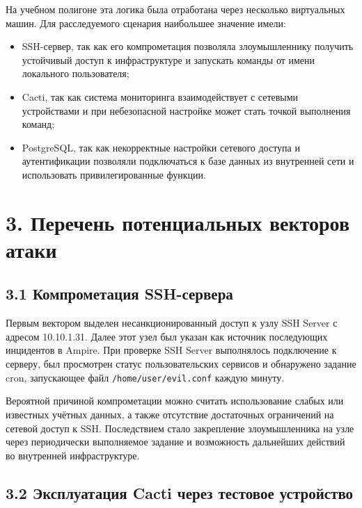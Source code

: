 \documentclass[14pt]{extarticle}
\begin{document}
На учебном полигоне эта логика была отработана через несколько виртуальных машин. Для расследуемого сценария наибольшее значение имели:
\begin{itemize}
  \item SSH-сервер, так как его компрометация позволяла злоумышленнику получить устойчивый доступ к инфраструктуре и запускать команды от имени локального пользователя;
  \item Cacti, так как система мониторинга взаимодействует с сетевыми устройствами и при небезопасной настройке может стать точкой выполнения команд;
  \item PostgreSQL, так как некорректные настройки сетевого доступа и аутентификации позволяли подключаться к базе данных из внутренней сети и использовать привилегированные функции.
\end{itemize}

\clearpage

\section*{3. Перечень потенциальных векторов атаки}

\subsection*{3.1 Компрометация SSH-сервера}

Первым вектором выделен несанкционированный доступ к узлу SSH Server с адресом 10.10.1.31. Далее этот узел был указан как источник последующих инцидентов в Ampire. При проверке SSH Server выполнялось подключение к серверу, был просмотрен статус пользовательских сервисов и обнаружено задание cron, запускающее файл \texttt{/home/user/evil.conf} каждую минуту.

Вероятной причиной компрометации можно считать использование слабых или известных учётных данных, а также отсутствие достаточных ограничений на сетевой доступ к SSH. Последствием стало закрепление злоумышленника на узле через периодически выполняемое задание и возможность дальнейших действий во внутренней инфраструктуре.

\subsection*{3.2 Эксплуатация Cacti через тестовое устройство}
\end{document}
